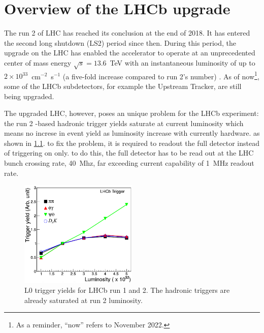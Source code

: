 \chapter{Overview of the LHCb upgrade}
\label{ref:lhcb-upgrade-overview}

The run 2 of LHC has reached its conclusion at the end of 2018.
It has entered the second long shutdown (LS2) period since then.
During this period,
the upgrade on the LHC has enabled the accelerator to operate at
an unprecedented center of mass energy $\sqrt{s} = 13.6$~TeV with an
instantaneous luminosity of up to $2 \times 10^{33}$~cm$^{-2}$~s$^{-1}$ (a
five-fold increase compared to run 2's number)
\cite{CERN_news:2022,Piucci_2017}.
As of now\footnote{
    As a reminder, ``now'' refers to November 2022.
}, some of the LHCb subdetectors, for example the Upstream Tracker, are still
being upgraded.

The upgraded LHC, however, poses an unique problem for the LHCb experiment:
the run 2 \pt-based hadronic trigger yields saturate at current luminosity which means
no increse in event yield as luminosity increase with currently hardware.
as shown in \cref{fig:l0-trigger-eff}.
to fix the problem, it is required to readout the full detector instead of triggering
on \pt only.
to do this, the full detector has to be read out at the LHC bunch crossing rate,
40~Mhz, far exceeding current capability of 1~MHz readout rate.

\begin{figure}[!htb]
    \centering
    \includegraphics[width=0.5\textwidth]{./figs-lhcb-upgrade-overview/trigger_efficiency.pdf}
    \caption{
        L0 trigger yields for LHCb run 1 and 2.
        The hadronic triggers are already saturated at run 2 luminosity.
    }
    \label{fig:l0-trigger-eff}
\end{figure}


